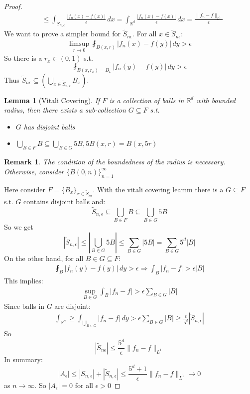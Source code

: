 \documentclass{report}
\theoremstyle{tommy}
\newtheorem{lem}[defn]{Lemma}
\newtheorem{rem}[defn]{Remark}
\begin{document}
\begin{proof}
\begin{align*}
      &\le \int_{S_{n, \epsilon}} \frac{|f_n(x) - f(x)|}{\epsilon} \, dx
      = \int_{\mathbb{R}^d} \frac{|f_n(x) - f(x)|}{\epsilon} \, dx
      = \frac{\|f_n - f\|_{L^1}}{\epsilon}
    \end{align*}
    We want to prove a simpler bound for \(\tilde S_{n \epsilon}\). For all \(x \in \tilde S_{n \epsilon}\): 
    \begin{align*}
      \limsup_{r \to 0} \fint_{B(x, r)} |f_n(x) - f(y)| \, dy > \epsilon
    \end{align*}
    So there is a \(r_x \in (0,1)\) s.t.
    \[\fint_{B(x,r_x) = B_x} |f_n(y) - f(y)| \, dy > \epsilon\]
    Thus \(\tilde S_{n \epsilon} \subseteq \left(\bigcup_{x \in \tilde S_{n, \epsilon}} B_x\right)\). 
    
    \begin{lem}[Vitali Covering]
      If \(F\) is a collection of balls in \(\mathbb{R}^d\) with bounded radius, then there exists a sub-collection \(G \subseteq F\) s.t.
      \begin{itemize}
        \item \(G\) has disjoint balls
        \item \(\bigcup_{B \in F} B \subseteq \bigcup_{B \in G} 5B, 5B(x,r) = B(x, 5r)\)
      \end{itemize}
    \end{lem}

    \begin{rem}
      The condition of the boundedness of the radius is necessary. Otherwise, consider \(\{B(0,n)\}_{n=1}^\infty\)
    \end{rem}

    Here consider \(F = \{B_x\}_{x \in \tilde S_{n \epsilon}}\). With the vitali covering leamm there is a \(G \subseteq F\) s.t. \(G \) contains disjoint balls and:
    \[\tilde S_{n, \epsilon} \subseteq \bigcup_{B \in F} B \subseteq \bigcup_{B \in G} 5 B\]
    So we get
    \[|\tilde S_{n, \epsilon}| \le |\bigcup_{B \in G} 5B| \le \sum_{B \in G} |5B| = \sum_{B \in G} 5^d|B|\]
    On the other hand, for all \(B \in G \subseteq F\): 
    \begin{align*}
      \fint_B |f_n(y) - f(y)| \, dy > \epsilon \Rightarrow \int_B |f_n - f| > \epsilon|B|
    \end{align*}
    This implies:
    \begin{align*}
      \sup_{B \in G} \int_B |f_n - f| > \epsilon \sum_{B \in G} |B|
    \end{align*}
    Since balls in \(G\) are disjoint:
    \begin{align*}
      \int_{\mathbb{R}^d} \ge \int_{\bigcup_{B \in G}} |f_n - f| \, dy 
      > \epsilon \sum_{B \in G} |B|
      \ge \frac{\epsilon}{5^d} |\tilde S_{n, \epsilon}|
    \end{align*}
    So 
    \[|\tilde S_{n \epsilon}| \le \frac{5^d}{\epsilon} \|f_n - f\|_{L^1}\]
    In summary: 
    \[|A_\epsilon| \le |S_{n, \epsilon}| + |\tilde S_{n, \epsilon}| \le \frac{5^d + 1}{\epsilon} \|f_n - f\|_{L^1} \to 0\]
    as \(n \to \infty\). So \(|A_\epsilon| = 0\) for all \(\epsilon > 0\)
  \end{proof}
  
\end{document}
